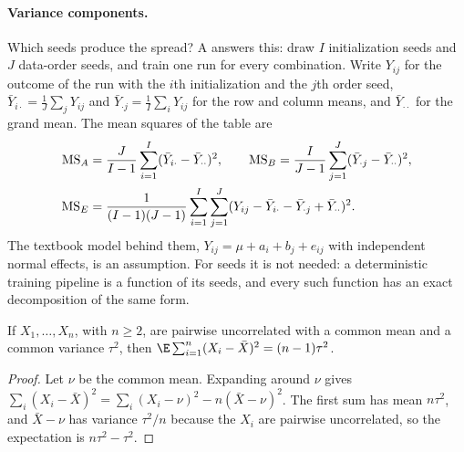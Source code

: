 \begin{refsection}
\paragraph{Variance components.} Which seeds produce the spread? A  answers this: draw $I$ initialization seeds and $J$ data-order seeds, and train one run for every combination. Write $Y_{ij}$ for the outcome of the run with the $i$th initialization and the $j$th order seed, $\bar Y_{i\cdot}=\frac1J\sum_jY_{ij}$ and $\bar Y_{\cdot j}=\frac1I\sum_iY_{ij}$ for the row and column means, and $\bar Y_{\cdot\cdot}$ for the grand mean. The mean squares of the table are
\begin{equation}\label{eq:seeds:ms}
\begin{aligned}
\mathrm{MS}_{A}&=\frac{J}{I-1}\sum_{i=1}^I(\bar Y_{i\cdot}-\bar Y_{\cdot\cdot})^2,\qquad
\mathrm{MS}_{B}=\frac{I}{J-1}\sum_{j=1}^J(\bar Y_{\cdot j}-\bar Y_{\cdot\cdot})^2,\\
\mathrm{MS}_{E}&=\frac{1}{(I-1)(J-1)}\sum_{i=1}^I\sum_{j=1}^J(Y_{ij}-\bar Y_{i\cdot}-\bar Y_{\cdot j}+\bar Y_{\cdot\cdot})^2 .
\end{aligned}
\end{equation}
The textbook model behind them, $Y_{ij}=\mu+a_i+b_j+e_{ij}$ with independent normal effects, is an assumption. For seeds it is not needed: a deterministic training pipeline is a function of its seeds, and every such function has an exact decomposition of the same form.

\begin{lemma}\label{lem:seeds:centered}
If $X_1,\dots,X_n$, with $n\ge2$, are pairwise uncorrelated with a common mean and a common variance $\tau^2$, then $\E\sum_{i=1}^n(X_i-\bar X)^2=(n-1)\tau^2$.
\end{lemma}

\begin{proof}
Let $\nu$ be the common mean. Expanding around $\nu$ gives $\sum_i(X_i-\bar X)^2=\sum_i(X_i-\nu)^2-n(\bar X-\nu)^2$. The first sum has mean $n\tau^2$, and $\bar X-\nu$ has variance $\tau^2/n$ because the $X_i$ are pairwise uncorrelated, so the expectation is $n\tau^2-\tau^2$.
\end{proof}


\end{refsection}
